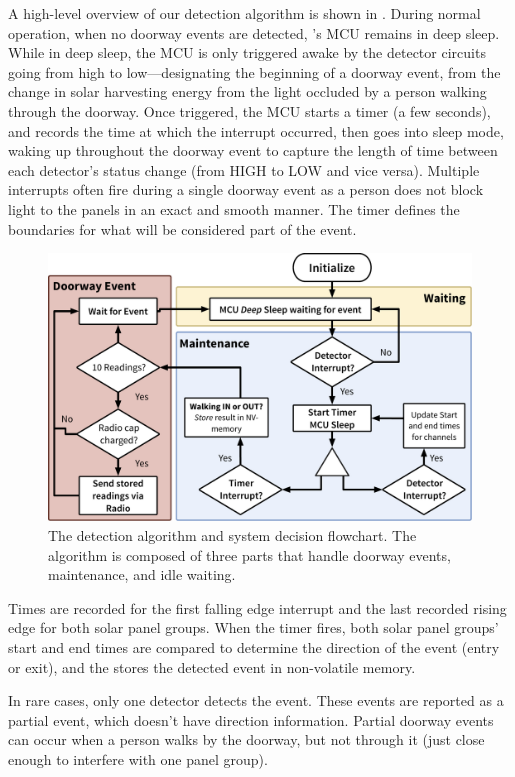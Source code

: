 A high-level overview of our detection algorithm is shown in . During normal operation, when no doorway events are detected, \sysname's MCU remains in deep sleep.
While in deep sleep, the MCU is only triggered awake by the detector circuits going from high to low---designating the beginning of a doorway event, from the change in solar harvesting energy from the light occluded by a person walking through the doorway.
Once triggered, the MCU starts a timer (a few seconds), and records the time at which the interrupt occurred, then goes into sleep mode, waking up throughout the doorway event to capture the length of time between each detector's status change (from HIGH to LOW and vice versa).
Multiple interrupts often fire during a single doorway event as a person does not block light to the panels in an exact and smooth manner.
The timer defines the boundaries for what will be considered part of the event.

\begin{figure}[t]
\centering
\includegraphics[width=0.75\columnwidth]{figs/software.pdf}
\caption{The \sysname detection algorithm and system decision flowchart. The algorithm is composed of three parts that handle doorway events, maintenance, and idle waiting. \label{fig:software}}
\end{figure}


Times are recorded for the first falling edge interrupt and the last recorded rising edge for both solar panel groups.
When the timer fires, both solar panel groups' start and end times are compared to determine the direction of the event (entry or exit), and the \sysname stores the detected event in non-volatile memory.


In rare cases, only one detector detects the event.
These events are reported as a partial event, which doesn't have direction information.
Partial doorway events can occur when a person walks by the doorway, but not through it (just close enough to interfere with one panel group).


